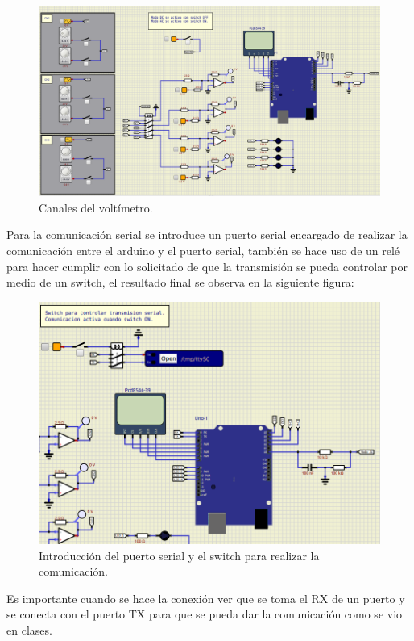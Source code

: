 \begin{figure}[H]
\centering
\includegraphics[width=.8\linewidth]{Imagenes/7.png}
 \caption{Canales del voltímetro.}
 \label{fig7}
\end{figure}

Para la comunicación serial se introduce un puerto serial encargado de realizar la comunicación entre el arduino y el puerto serial, también se hace uso de un relé para hacer cumplir con lo solicitado de que la transmisión se pueda controlar por medio de un switch, el resultado final se observa en la siguiente figura:
\begin{figure}[H]
    \centering
    \includegraphics[width=.8\linewidth]{Imagenes/8.png}
    \caption{Introducción del puerto serial y el switch para realizar la comunicación.}
    \label{figk1}
\end{figure}

Es importante cuando se hace la conexión ver que se toma el RX de un puerto y se conecta con el puerto TX para que se pueda dar la comunicación como se vio en clases.
























\newpage
